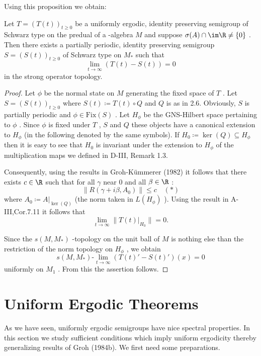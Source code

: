 Using this proposition we obtain:

\begin{theorem}\label{thm:d4-3.11}
Let $ T = (T(t))_{t \geq 0} $  be a uniformly ergodic, identity preserving semigroup of Schwarz type on the predual of a \WA-algebra $ M $  and suppose $ \sigma(A) \cap \im\R \neq \{0\} $ .
Then there exists a partially periodic, identity preserving semigroup $ S = (S(t))_{t \geq 0} $  of Schwarz type on $ M_{*} $  such that
\[
\lim_{t \to \infty} (T(t) - S(t)) = 0
\]
in the strong operator topology.
\end{theorem}

\begin{proof}
Let $ \phi $  be the normal state on $ M $  generating the fixed space of $ T $ .
Let $ S = (S(t))_{t \geq 0} $  where $ S(t) \coloneqq T(t) \circ Q $  and $ Q $  is as in 2.6.
Obviously, $ S $  is partially periodic and $ \phi \in \text{Fix}(S) $ .
Let $ H_{\phi} $  be the GNS-Hilbert space pertaining to $ \phi $ .
Since $ \phi $  is fixed under $ T $ , $ S $  and $ Q $  these objects have a canonical extension to $ H_{\phi} $  (in the following denoted by the same symbols).
If $ H_{0} \coloneqq \ker(Q) \subseteq H_{\phi} $  then it is easy to see that $ H_{0} $  is invariant under the extension to $ H_{\phi} $  of the multiplication maps we defined in D-III, Remark 1.3.

Consequently, using the results in Groh-Kümmerer (1982) it follows that there exists $ c \in \R $  such that for all $ \gamma $  near $ 0 $  and all $ \beta \in \R $ :
\[
\|R(\gamma + i\beta,A_{0})\| \leq c \quad (*)
\]
where $ A_{0} \coloneqq A|_{\ker(Q)} $  (the norm taken in $ L(H_{\phi}) $ ).
Using the result in A-III,Cor.7.11 it follows that
\[
\lim_{t \to \infty} \|T(t)|_{H_{0}}\| = 0.
\]

Since the $ s(M,M_{*}) $ -topology on the unit ball of $ M $  is nothing else than the restriction of the norm topology on $ H_{\phi} $ , we obtain
\[
s(M,M_{*})\text{-}\lim_{t \to \infty} (T(t)' - S(t)')(x) = 0
\]
uniformly on $ M_{1} $ .
From this the assertion follows.
\end{proof}

\newpage

\section{Uniform Ergodic Theorems}

As we have seen, uniformly ergodic semigroups have nice spectral properties.
In this section we study sufficient conditions which imply uniform ergodicity thereby generalizing results of Groh (1984b).
We first need some preparations.

